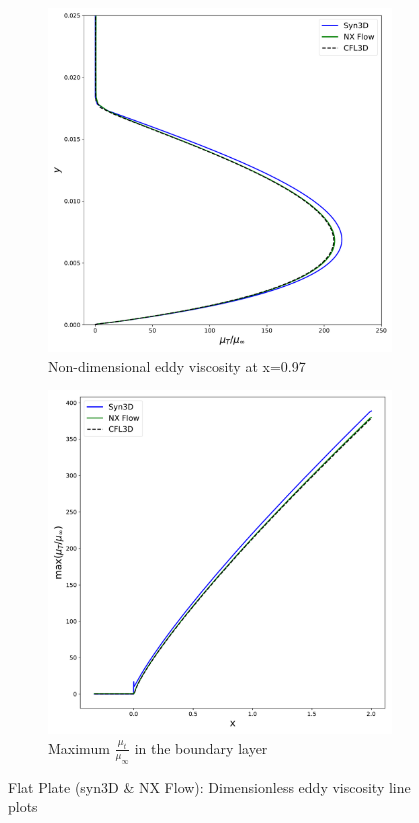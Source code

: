 \begin{figure}[ht!]
\centering
\begin{subfigure}{.45\textwidth}
  \centering
  \includegraphics[width=1.0\textwidth]{figs/flat/mut_x097.pdf}
  \caption{Non-dimensional eddy viscosity at x=0.97 }
\end{subfigure}%
\begin{subfigure}{.45\textwidth}
  \centering
  \includegraphics[width=1.0\textwidth]{figs/flat/maxmut.pdf}
  \caption{Maximum $\frac{\mu_t}{\mu_{\infty}}$ in the boundary layer}
  \label{fig:flatmutmax}
\end{subfigure}
\caption{Flat Plate (syn3D \& NX Flow): Dimensionless eddy viscosity line plots}
\label{fig:flatmu}
\end{figure}

